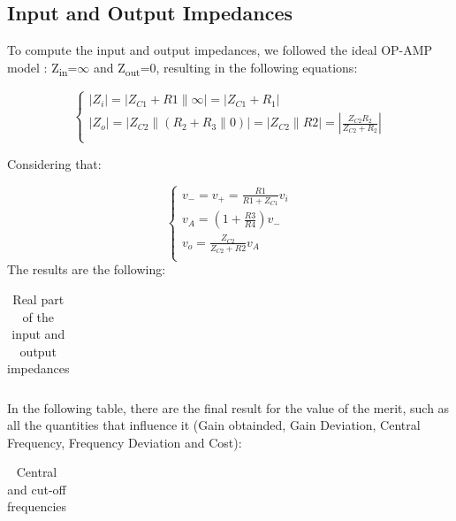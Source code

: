 \subsection{Input and Output Impedances}

To compute the input and output impedances, we followed the ideal OP-AMP model : Z\textsubscript{in}=$\infty$ and Z\textsubscript{out}=0, resulting in the following equations:

\begin{equation}\label{impedances}
\begin{cases}
  |Z_i| = |Z_{C1} + R1 \parallel \infty| = |Z_{C1} + R_1|\\
  |Z_o| = |Z_{C2} \parallel (R_2 + R_3 \parallel 0)| = |Z_{C2} \parallel R2| 
  = |\frac{Z_{C2}R_2}{Z_{C2}+R_2}|\\
 \end{cases}
\end{equation}


 Considering that:
 
 \begin{equation}
 \begin{cases}
    v_- = v_+ = \frac{R1}{R1+Z_{C1}} v_i\\
    v_A = \left(1 + \frac{R3}{R4}\right) v_-\\
    v_o = \frac{Z_{C2}}{Z_{C2}+R2} v_A\\
  \end{cases}
 \end{equation}
The results are the following:

\begin{table}[!htb]
\centering
  \begin{tabular}{|c|c|}
    \hline    
    
 \end{tabular}
 \caption{Real part of the input and output impedances}\label{tab:theo:impedances}
\end{table}

In the following table, there are the final result for the value of the merit, such as all the quantities that influence it (Gain obtainded, Gain Deviation, Central Frequency, Frequency Deviation and Cost):


\begin{table}[!htb]
\centering
  \begin{tabular}{|c | c|}
    \hline    
    
 \end{tabular}
 \caption{Central and cut-off frequencies}\label{tab:theo:frequencies}
\end{table}



